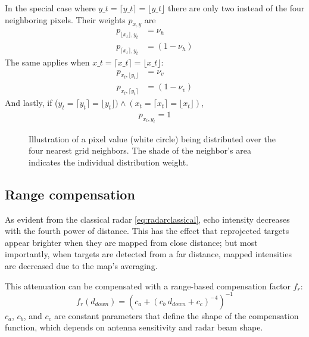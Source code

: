 In the special case where $y\_t = \lceil y\_t \rceil = \lfloor y\_t\rfloor$ there are only two instead of the four neighboring pixels. Their weights \(p_{x,y}\) are
\begin{align*}
p_{\lfloor x_t \rfloor, y_t} &= \nu_h\\
p_{\lceil x_t \rceil, y_t} &= (1 - \nu_h)
\end{align*}
The same applies when $x\_t = \lceil x\_t \rceil = \lfloor x\_t\rfloor$:
\begin{align*}
p_{x_t, \lfloor y_t \rfloor} &= \nu_v\\
p_{x_t, \lceil y_t \rceil} &= (1 - \nu_v)
\end{align*}
And lastly, if
(\(y_t = \lceil y_t \rceil = \lfloor y_t \rfloor ) \land (x_t = \lceil x_t \rceil = \lfloor x_t \rfloor )\),
\begin{align*}
p_{x_t, y_t} = 1
\end{align*}


\begin{figure}[htbp]
    \centering
    \def\svgwidth{10cm}
    
    \caption{Illustration of a pixel value (white circle) being distributed over the four nearest grid neighbors. The shade of the neighbor's area indicates the individual distribution weight.}
    \label{fig:Sample_splitting}
\end{figure}

\subsection{Range compensation}\label{range-compensation}

As evident from the classical radar \cref{eq:radarclassical}, echo intensity decreases with
the fourth power of distance. This has the effect that reprojected
targets appear brighter when they are mapped from close distance; but
most importantly, when targets are detected from a far distance, mapped
intensities are decreased due to the map's averaging.

This attenuation can be compensated with a range-based compensation
factor \(f_r\):
\begin{equation} \label{eq:range_comp}
    f_r(d_{down}) = {
    \left(
    c_a + ( c_b~d_{down} + c_c)^{-4}
    \right) ^ {-1}
    }
\end{equation}
$c_a$, $c_b$, and $c_c$ are constant parameters that define the shape of the compensation function, which depends on antenna sensitivity and radar beam shape.

